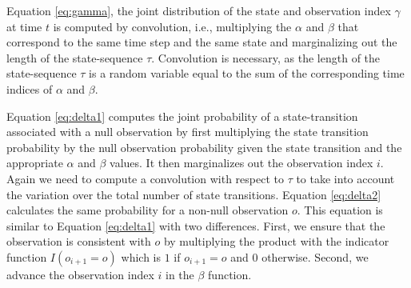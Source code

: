 \documentclass[letterpaper]{article}
\begin{document}
Equation \ref{eq:gamma}, the joint distribution of the state and observation index $\gamma$ at time $t$ is computed by convolution, i.e., multiplying the $\alpha$ and $\beta$ that correspond to the same time step and the same state and marginalizing out the length of the state-sequence $\tau$. Convolution is necessary, as the length of the state-sequence $\tau$ is a random variable equal to the sum of the corresponding time indices of $\alpha$ and $\beta$.

Equation \ref{eq:delta1} computes the joint probability of a state-transition associated with a null observation by first multiplying the state transition probability by the null observation probability given the state transition and the appropriate $\alpha$ and $\beta$ values. It then marginalizes out the observation index $i$. Again we need to compute a convolution with respect to $\tau$ to take into account the variation over the total number of state transitions.  
Equation \ref{eq:delta2} calculates the same probability for a non-null observation $o$. This equation is similar to Equation \ref{eq:delta1} with two differences.  First, we ensure that the observation is consistent with $o$ by multiplying the product with the indicator function $I(o_{i+1} = o)$ which is $1$ if $o_{i+1} = o$ and $0$ otherwise.  Second, we advance the observation index $i$ in the $\beta$ function.
\end{document}

